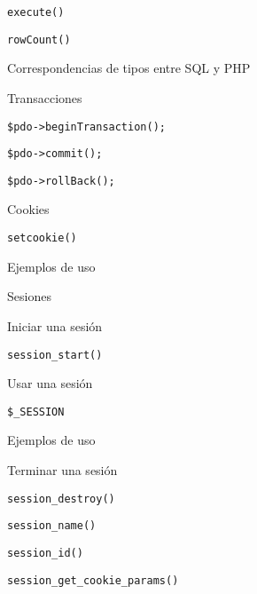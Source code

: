 \begin{longenum}
\begin{longenum}
\begin{longenum}
\begin{longenum}
                \item \texttt{execute()}
                \item \texttt{rowCount()}
            \end{longenum}
            \item Correspondencias de tipos entre SQL y PHP
            \item Transacciones 
            \begin{longenum}
                \item \texttt{\$pdo->beginTransaction();}
                \item \texttt{\$pdo->commit();}
                \item \texttt{\$pdo->rollBack();}
            \end{longenum}
        \end{longenum}
        \item Cookies
        \begin{longenum}
            \item \texttt{setcookie()}
            \item Ejemplos de uso
        \end{longenum}
        \item Sesiones
        \begin{longenum}
            \item Iniciar una sesión
            \begin{longenum}
                \item \texttt{session\_start()}
            \end{longenum}
            \item Usar una sesión
            \begin{longenum}
                \item \texttt{\$\_SESSION}
                \item Ejemplos de uso
            \end{longenum}
            \item Terminar una sesión
            \begin{longenum}
                \item \texttt{session\_destroy()}
                \item \texttt{session\_name()}
                \item \texttt{session\_id()}
                \item \texttt{session\_get\_cookie\_params()}
            \end{longenum}
        \end{longenum}

\end{longenum}
\end{longenum}
